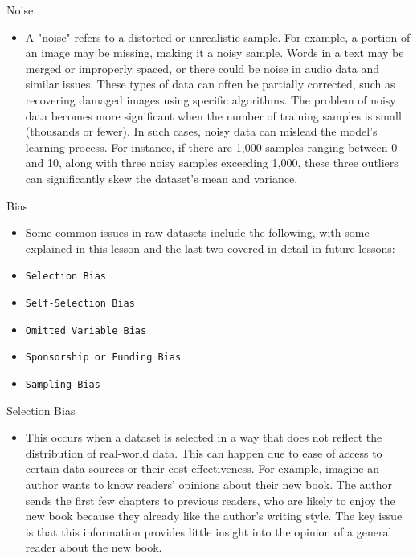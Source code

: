 \documentclass[serif, aspectratio=169]{beamer}
\begin{document}
\begin{frame}{Noise}
    \begin{itemize}
        \item A "noise" refers to a distorted or unrealistic sample. For example, a portion of an image may be missing, making it a noisy sample. Words in a text may be merged or improperly spaced, or there could be noise in audio data and similar issues. These types of data can often be partially corrected, such as recovering damaged images using specific algorithms. The problem of noisy data becomes more significant when the number of training samples is small (thousands or fewer). In such cases, noisy data can mislead the model's learning process. For instance, if there are 1,000 samples ranging between 0 and 10, along with three noisy samples exceeding 1,000, these three outliers can significantly skew the dataset's mean and variance.
    \end{itemize}
\end{frame}

\begin{frame}{Bias}
    \begin{itemize}
        \item Some common issues in raw datasets include the following, with some explained in this lesson and the last two covered in detail in future lessons:
        \item \texttt{\color{red}Selection Bias}
        \item \texttt{\color{red}Self-Selection Bias}
        \item \texttt{\color{red}Omitted Variable Bias}
        \item \texttt{\color{red}Sponsorship or Funding Bias}
        \item \texttt{\color{red}Sampling Bias}
    \end{itemize}
\end{frame}

\begin{frame}{Selection Bias}
    \begin{itemize}
        \item This occurs when a dataset is selected in a way that does not reflect the distribution of real-world data. This can happen due to ease of access to certain data sources or their cost-effectiveness. For example, imagine an author wants to know readers' opinions about their new book. The author sends the first few chapters to previous readers, who are likely to enjoy the new book because they already like the author's writing style. The key issue is that this information provides little insight into the opinion of a general reader about the new book.
    \end{itemize}
\end{frame}
\end{document}
